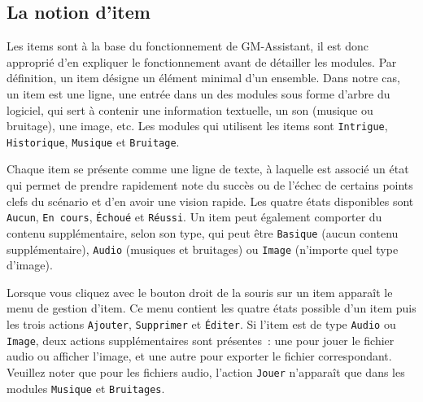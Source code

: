 \documentclass[a4paper,12pt]{article}
\newcommand*{\GMA}{GM-Assistant\xspace}
\newcommand*{\interfaceitem}[1]{\texttt{#1}}
\begin{document}
\subsection{La notion d'item}
\label{item}

Les items sont à la base du fonctionnement de \GMA, il est donc approprié d'en expliquer le fonctionnement avant de détailler les modules.
Par définition, un item désigne un élément minimal d'un ensemble.
Dans notre cas, un item est une ligne, une entrée dans un des modules sous forme d'arbre du logiciel, qui sert à contenir une information textuelle, un son (musique ou bruitage), une image, etc.
Les modules qui utilisent les items sont \interfaceitem{Intrigue}, \interfaceitem{Historique}, \interfaceitem{Musique} et \interfaceitem{Bruitage}.

Chaque item se présente comme une ligne de texte, à laquelle est associé un état qui permet de prendre rapidement note du succès ou de l'échec de certains points clefs du scénario et d'en avoir une vision rapide.
Les quatre états disponibles sont \interfaceitem{Aucun}, \interfaceitem{En cours}, \interfaceitem{Échoué} et \interfaceitem{Réussi}.
Un item peut également comporter du contenu supplémentaire, selon son type, qui peut être \interfaceitem{Basique} (aucun contenu supplémentaire), \interfaceitem{Audio} (musiques et bruitages) ou \interfaceitem{Image} (n'importe quel type d'image).

Lorsque vous cliquez avec le bouton droit de la souris sur un item apparaît le menu de gestion d'item.
Ce menu contient les quatre états possible d'un item puis les trois actions \interfaceitem{Ajouter}, \interfaceitem{Supprimer} et \interfaceitem{Éditer}.
Si l'item est de type \interfaceitem{Audio} ou \interfaceitem{Image}, deux actions supplémentaires sont présentes~: une pour jouer le fichier audio ou afficher l'image, et une autre pour exporter le fichier correspondant.
Veuillez noter que pour les fichiers audio, l'action \interfaceitem{Jouer} n'apparaît que dans les modules \interfaceitem{Musique} et \interfaceitem{Bruitages}.
\end{document}
